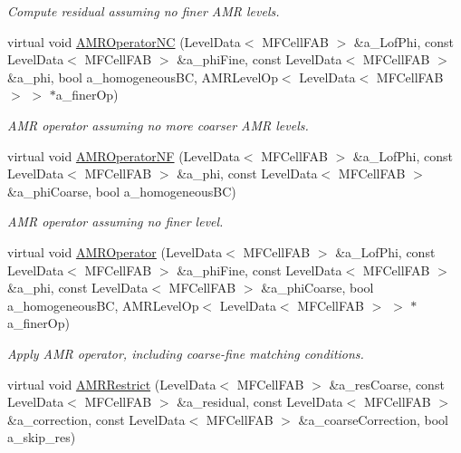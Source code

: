 \begin{DoxyCompactItemize}
\begin{DoxyCompactList}\small\item\em Compute residual assuming no finer A\+MR levels. \end{DoxyCompactList}\item 
virtual void \hyperlink{classmfconductivityop_a29d83c69e825e91598871f9d537341ea}{A\+M\+R\+Operator\+NC} (Level\+Data$<$ M\+F\+Cell\+F\+AB $>$ \&a\+\_\+\+Lof\+Phi, const Level\+Data$<$ M\+F\+Cell\+F\+AB $>$ \&a\+\_\+phi\+Fine, const Level\+Data$<$ M\+F\+Cell\+F\+AB $>$ \&a\+\_\+phi, bool a\+\_\+homogeneous\+BC, A\+M\+R\+Level\+Op$<$ Level\+Data$<$ M\+F\+Cell\+F\+AB $>$ $>$ $\ast$a\+\_\+finer\+Op)
\begin{DoxyCompactList}\small\item\em A\+MR operator assuming no more coarser A\+MR levels. \end{DoxyCompactList}\item 
virtual void \hyperlink{classmfconductivityop_a6bbecdde37adb5c99917f69c73df9e89}{A\+M\+R\+Operator\+NF} (Level\+Data$<$ M\+F\+Cell\+F\+AB $>$ \&a\+\_\+\+Lof\+Phi, const Level\+Data$<$ M\+F\+Cell\+F\+AB $>$ \&a\+\_\+phi, const Level\+Data$<$ M\+F\+Cell\+F\+AB $>$ \&a\+\_\+phi\+Coarse, bool a\+\_\+homogeneous\+BC)
\begin{DoxyCompactList}\small\item\em A\+MR operator assuming no finer level. \end{DoxyCompactList}\item 
virtual void \hyperlink{classmfconductivityop_a7939be06e41b605bfa243a79b19b6581}{A\+M\+R\+Operator} (Level\+Data$<$ M\+F\+Cell\+F\+AB $>$ \&a\+\_\+\+Lof\+Phi, const Level\+Data$<$ M\+F\+Cell\+F\+AB $>$ \&a\+\_\+phi\+Fine, const Level\+Data$<$ M\+F\+Cell\+F\+AB $>$ \&a\+\_\+phi, const Level\+Data$<$ M\+F\+Cell\+F\+AB $>$ \&a\+\_\+phi\+Coarse, bool a\+\_\+homogeneous\+BC, A\+M\+R\+Level\+Op$<$ Level\+Data$<$ M\+F\+Cell\+F\+AB $>$ $>$ $\ast$a\+\_\+finer\+Op)
\begin{DoxyCompactList}\small\item\em Apply A\+MR operator, including coarse-\/fine matching conditions. \end{DoxyCompactList}\item 
virtual void \hyperlink{classmfconductivityop_a7b7f200bcf1ab1fb616fab3f6b9c3188}{A\+M\+R\+Restrict} (Level\+Data$<$ M\+F\+Cell\+F\+AB $>$ \&a\+\_\+res\+Coarse, const Level\+Data$<$ M\+F\+Cell\+F\+AB $>$ \&a\+\_\+residual, const Level\+Data$<$ M\+F\+Cell\+F\+AB $>$ \&a\+\_\+correction, const Level\+Data$<$ M\+F\+Cell\+F\+AB $>$ \&a\+\_\+coarse\+Correction, bool a\+\_\+skip\+\_\+res)

\end{DoxyCompactItemize}

